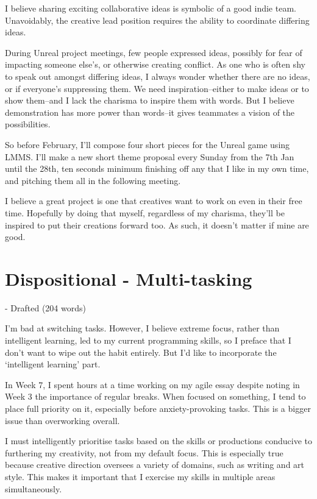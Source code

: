 \documentclass{scrartcl}
\begin{document}
I believe sharing exciting collaborative ideas is symbolic of a good indie team. Unavoidably, the creative lead position requires the ability to coordinate differing ideas.

During Unreal project meetings, few people expressed ideas, possibly for fear of impacting someone else's, or otherwise creating conflict. As one who is often shy to speak out amongst differing ideas, I always wonder whether there are no ideas, or if everyone's suppressing them. We need inspiration--either to make ideas or to show them--and I lack the charisma to inspire them with words. But I believe demonstration has more power than words--it gives teammates a vision of the possibilities.

So before February, I'll compose four short pieces for the Unreal game using LMMS. I'll make a new short theme proposal every Sunday from the 7th Jan until the 28th, ten seconds minimum finishing off any that I like in my own time, and pitching them all in the following meeting.

I believe a great project is one that creatives want to work on even in their free time. Hopefully by doing that myself, regardless of my charisma, they'll be inspired to put their creations forward too. As such, it doesn't matter if mine are good.

\section{Dispositional - Multi-tasking} - Drafted (204 words)

I'm bad at switching tasks. However, I believe extreme focus, rather than intelligent learning, led to my current programming skills, so I preface that I don't want to wipe out the habit entirely. But I'd like to incorporate the `intelligent learning' part.

In Week 7, I spent hours at a time working on my agile essay despite noting in Week 3 the importance of regular breaks. When focused on something, I tend to place full priority on it, especially before anxiety-provoking tasks. This is a bigger issue than overworking overall.

I must intelligently prioritise tasks based on the skills or productions conducive to furthering my creativity, not from my default focus. This is especially true because creative direction oversees a variety of domains, such as writing and art style. This makes it important that I exercise my skills in multiple areas simultaneously.
\end{document}

